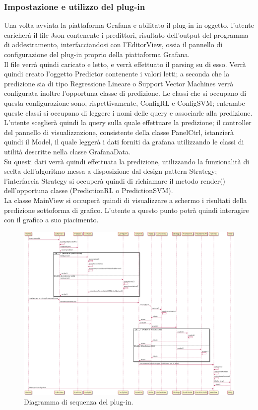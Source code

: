 \documentclass[../manuale-sviluppatore.tex]{subfiles}
\begin{document}
\subsubsection{Impostazione e utilizzo del plug-in}
Una volta avviata la piattaforma Grafana e abilitato il plug-in in oggetto, l'utente caricherà il file Json contenente i predittori, risultato dell'output del programma di addestramento, interfacciandosi con l'EditorView, ossia il pannello di configurazione del plug-in proprio della piattaforma Grafana. \\
Il file verrà quindi caricato e letto, e verrà effettuato il parsing su di esso. Verrà quindi creato l'oggetto Predictor contenente i valori letti; a seconda che la predizione sia di tipo Regressione Lineare o Support Vector Machines verrà configurata inoltre l'opportuna classe di predizione. Le classi che si occupano di questa configurazione sono, rispettivamente, ConfigRL e ConfigSVM; entrambe queste classi si occupano di leggere i nomi delle query e associarle alla predizione. \\
L'utente sceglierà quindi la query sulla quale effettuare la predizione; il controller del pannello di visualizzazione, consistente della classe PanelCtrl, istanzierà quindi il Model, il quale leggerà i dati forniti da grafana utilizzando le classi di utilità descritte nella classe GrafanaData. \\
Su questi dati verrà quindi effettuata la predizione, utilizzando la funzionalità di scelta dell'algoritmo messa a disposizione dal design pattern Strategy; l'interfaccia Strategy si occuperà quindi di richiamare il metodo render() dell'opportuna classe (PredictionRL o PredictionSVM). \\
La classe MainView si occuperà quindi di visualizzare a schermo i risultati della predizione sottoforma di grafico. L'utente a questo punto potrà quindi interagire con il grafico a suo piacimento.

\begin{figure}[H]
  \centering
  \includegraphics[width=15cm]{img/plugin/sequenceDiagramPlug.png}
  \caption{Diagramma di sequenza del plug-in.}
\end{figure}
\end{document}
